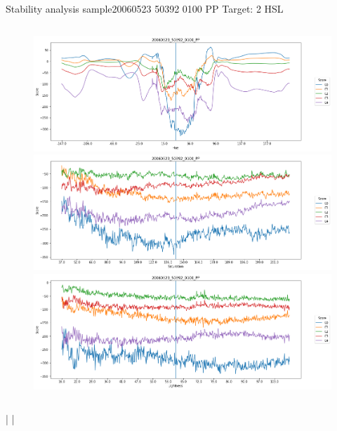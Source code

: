 \documentclass{beamer}
\begin{document}
\begin{frame}{Stability analysis sample}{20060523 50392 0100 PP Target: 2 HSL}
\begin{columns}
\begin{column}{0.45\textwidth}
\begin{figure}[p]
			\includegraphics[width=\textwidth]{chapter_stability/20060523_50392_0100_PP/h/scores.png}			\includegraphics[width=\textwidth]{chapter_stability/20060523_50392_0100_PP/s/scores.png}			\includegraphics[width=\textwidth]{chapter_stability/20060523_50392_0100_PP/l/scores.png}
		\end{figure}
	\end{column}
\end{columns}
\href{run:videos_stability/Messidor_20060523_50392_0100_PP_Target_2_Checking_Hue_Sensitivity.mp4}{\color{blue}{Hue}} | \href{run:videos_stability/Messidor_20060523_50392_0100_PP_Target_2_Checking_Saturation_Sensitivity.mp4}{\color{blue}{Saturation}} | \href{run:videos_stability/Messidor_20060523_50392_0100_PP_Target_2_Checking_Luminance_Sensitivity.mp4}{\color{blue}{Lightness}}
\end{frame}
\end{document}
